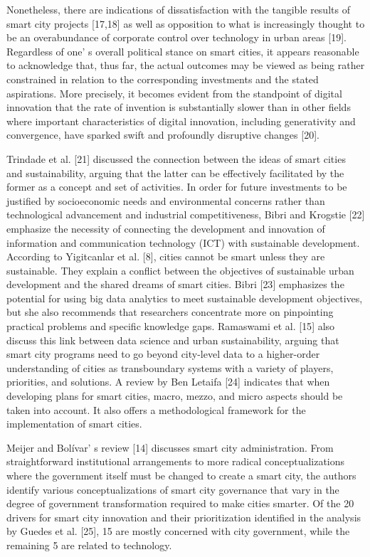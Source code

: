{Nonetheless, there are indications of dissatisfaction with the tangible
results of smart city projects {[}17,18{]} as well as opposition to what
is increasingly thought to be an overabundance of corporate control over
technology in urban areas {[}19{]}. Regardless of one' s
overall political stance on smart cities, it appears reasonable to
acknowledge that, thus far, the actual outcomes may be viewed as being
rather constrained in relation to the corresponding investments and the
stated aspirations. More precisely, it becomes evident from the
standpoint of digital innovation that the rate of invention is
substantially slower than in other fields where important
characteristics of digital innovation, including generativity and
convergence, have sparked swift and profoundly disruptive changes
{[}20{]}.

Trindade et al. {[}21{]} discussed the connection between the ideas of
smart cities and sustainability, arguing that the latter can be
effectively facilitated by the former as a concept and set of
activities. In order for future investments to be justified by
socioeconomic needs and environmental concerns rather than technological
advancement and industrial competitiveness, Bibri and Krogstie {[}22{]}
emphasize the necessity of connecting the development and innovation of
information and communication technology (ICT) with sustainable
development. According to Yigitcanlar et al. {[}8{]}, cities cannot be
smart unless they are sustainable. They explain a conflict between the
objectives of sustainable urban development and the shared dreams of
smart cities. Bibri {[}23{]} emphasizes the potential for using big data
analytics to meet sustainable development objectives, but she also
recommends that researchers concentrate more on pinpointing practical
problems and specific knowledge gaps. Ramaswami et al. {[}15{]} also
discuss this link between data science and urban sustainability, arguing
that smart city programs need to go beyond city-level data to a
higher-order understanding of cities as transboundary systems with a
variety of players, priorities, and solutions. A review by Ben Letaifa
{[}24{]} indicates that when developing plans for smart cities, macro,
mezzo, and micro aspects should be taken into account. It also offers a
methodological framework for the implementation of smart cities.

Meijer and Bolívar' s review {[}14{]} discusses smart
city administration. From straightforward institutional arrangements to
more radical conceptualizations where the government itself must be
changed to create a smart city, the authors identify various
conceptualizations of smart city governance that vary in the degree of
government transformation required to make cities smarter. Of the 20
drivers for smart city innovation and their prioritization identified in
the analysis by Guedes et al. {[}25{]}, 15 are mostly concerned with
city government, while the remaining 5 are related to technology.

}
